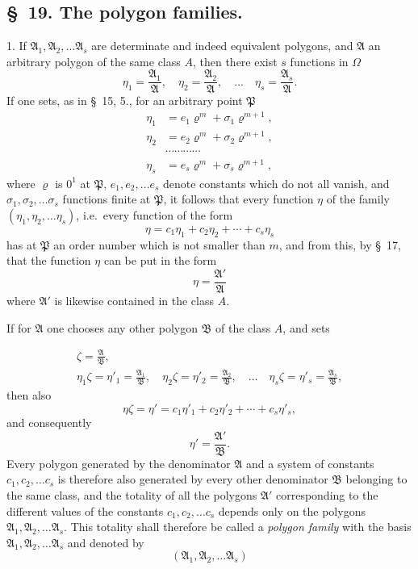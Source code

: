 \documentclass{article}
\begin{document}
\subsection*{§~19. The polygon families.}

1. If $\mathfrak{A}_{1}, \mathfrak{A}_{2}, \ldots \mathfrak{A}_{s}$ are determinate and indeed equivalent polygons, and $\mathfrak{A}$ an arbitrary polygon of the same class $A$, then there exist $s$ functions in $\Omega$
\[ \eta_{1} = \frac{\mathfrak{A}_{1}}{\mathfrak{A}}, \quad \eta_{2} = \frac{\mathfrak{A}_{2}}{\mathfrak{A}}, \quad \ldots \quad \eta_{s} = \frac{\mathfrak{A}_{s}}{\mathfrak{A}}. \]
If one sets, as in §~15, 5., for an arbitrary point $\mathfrak{P}$
\[ \begin{aligned} \eta_{1} &= e_{1}\varrho^{m} + \sigma_{1}\varrho^{m+1}, \\ \eta_{2} &= e_{2}\varrho^{m} + \sigma_{2}\varrho^{m+1}, \\ &\cdots\cdots\cdots\cdots \\ \eta_{s} &= e_{s}\varrho^{m} + \sigma_{s}\varrho^{m+1}, \end{aligned} \]
where $\varrho$ is $0^{1}$ at $\mathfrak{P}$, $e_{1}, e_{2}, \ldots e_{s}$ denote constants which do not all vanish, and $\sigma_{1}, \sigma_{2}, \ldots \sigma_{s}$ functions finite at $\mathfrak{P}$, it follows that every function $\eta$ of the family $(\eta_{1}, \eta_{2}, \ldots \eta_{s})$, i.e.\ every function of the form
\[ \eta = c_{1}\eta_{1} + c_{2}\eta_{2} + \cdots + c_{s}\eta_{s} \]
has at $\mathfrak{P}$ an order number which is not smaller than $m$, and from this, by §~17, that the function $\eta$ can be put in the form
\[ \eta = \frac{\mathfrak{A}'}{\mathfrak{A}} \]
where $\mathfrak{A}'$ is likewise contained in the class $A$.

If for $\mathfrak{A}$ one chooses any other polygon $\mathfrak{B}$ of the class $A$, and sets

\[ \begin{gathered} \zeta = \frac{\mathfrak{A}}{\mathfrak{B}}, \\ \eta_{1}\zeta = \eta'_{1} = \frac{\mathfrak{A}_{1}}{\mathfrak{B}}, \quad \eta_{2}\zeta = \eta'_{2} = \frac{\mathfrak{A}_{2}}{\mathfrak{B}}, \quad \ldots \quad \eta_{s}\zeta = \eta'_{s} = \frac{\mathfrak{A}_{s}}{\mathfrak{B}}, \end{gathered} \]
then also
\[ \eta\zeta = \eta' = c_{1}\eta'_{1} + c_{2}\eta'_{2} + \cdots + c_{s}\eta'_{s}, \]
and consequently
\[ \eta' = \frac{\mathfrak{A}'}{\mathfrak{B}}. \]
Every polygon generated by the denominator $\mathfrak{A}$ and a system of constants $c_{1}, c_{2}, \ldots c_{s}$ is therefore also generated by every other denominator $\mathfrak{B}$ belonging to the same class, and the totality of all the polygons $\mathfrak{A}'$ corresponding to the different values of the constants $c_{1}, c_{2}, \ldots c_{s}$ depends only on the polygons $\mathfrak{A}_{1}, \mathfrak{A}_{2}, \ldots \mathfrak{A}_{s}$. This totality shall therefore be called a \emph{polygon family} with the basis $\mathfrak{A}_{1}, \mathfrak{A}_{2}, \ldots \mathfrak{A}_{s}$ and denoted by
\[ (\mathfrak{A}_{1}, \mathfrak{A}_{2}, \ldots \mathfrak{A}_{s}) \]
\end{document}
